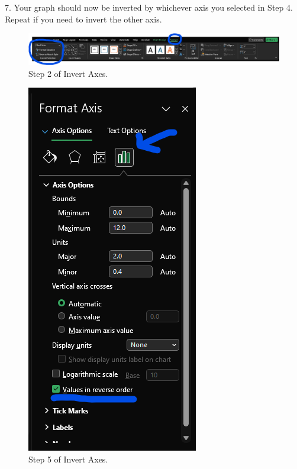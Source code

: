 \documentclass[11pt]{article}
\begin{document}
7. Your graph should now be inverted by whichever axis you selected in Step 4. Repeat if you need to invert the other axis.



\begin{figure}
    \centering
    \includegraphics[width=\linewidth]{Images/3step2.png}
    \caption{Step 2 of Invert Axes.}
    \label{fig:Graph3Step2}
\end{figure}

\begin{figure}
    \centering
    \includegraphics[width=0.3\linewidth]{Images/3step5.png}
    \caption{Step 5 of Invert Axes.}
    \label{fig:Graph3Step5}
\end{figure}
\end{document}
